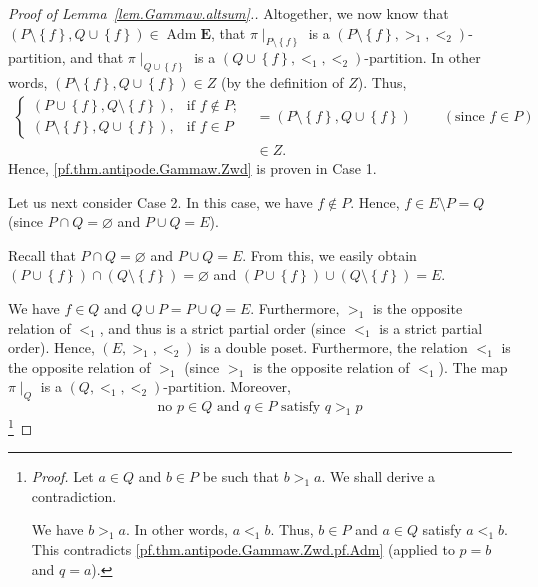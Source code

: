 \documentclass[12pt]{article}
\theoremstyle{plain}
\theoremstyle{definition}
\theoremstyle{remark}
\newcommand{\Adm}{\operatorname{Adm}}
\newcommand{\EE}{{\mathbf{E}}}
\begin{document}
\begin{proof}[Proof of Lemma~\ref{lem.Gammaw.altsum}.]
Altogether, we now know that $\left(  P\setminus\left\{  f\right\}
,Q\cup\left\{  f\right\}  \right)  \in \Adm \EE$, that
$\pi\mid_{P\setminus\left\{  f\right\}  }$ is a \newline
$\left(  P\setminus\left\{
f\right\}  ,>_{1},<_{2}\right)  $-partition, and that $\pi\mid_{Q\cup\left\{
f\right\}  }$ is a $\left(  Q\cup\left\{  f\right\}  ,<_{1},<_{2}\right)
$-partition. In other words, $\left(  P\setminus\left\{  f\right\}
,Q\cup\left\{  f\right\}  \right)  \in Z$ (by the definition of $Z$). Thus,
\begin{align*}
\begin{cases}
\left(  P\cup\left\{  f\right\}  ,Q\setminus\left\{  f\right\}  \right)  , &
\text{if }f\notin P;\\
\left(  P\setminus\left\{  f\right\}  ,Q\cup\left\{  f\right\}  \right)  , &
\text{if }f\in P
\end{cases}
& =\left(  P\setminus\left\{  f\right\}  ,Q\cup\left\{  f\right\}  \right)
\ \ \ \ \ \ \ \ \ \ \left(  \text{since }f\in P\right)  \\
& \in Z.
\end{align*}
Hence, \eqref{pf.thm.antipode.Gammaw.Zwd} is proven in Case 1.

Let us next consider Case 2. In this case, we have $f\notin P$. Hence,
$f \in E \setminus P = Q$ (since
$P \cap Q = \varnothing$ and $P \cup Q = E$).

Recall that $P\cap Q=\varnothing$ and $P\cup Q=E$. From this, we easily obtain
$\left(  P\cup\left\{  f\right\}  \right)  \cap\left(  Q\setminus\left\{
f\right\}  \right)  =\varnothing$ and $\left(  P\cup\left\{  f\right\}
\right)  \cup\left(  Q\setminus\left\{  f\right\}  \right)  =E$.

We have $f \in Q$ and
$Q \cup P = P \cup Q = E$. Furthermore, $>_1$ is the
opposite relation of $<_1$, and thus is a strict partial
order (since $<_1$ is a strict partial order). Hence,
$\left(E, >_1, <_2\right)$ is a double poset. Furthermore,
the relation $<_1$ is the opposite relation of $>_1$ (since $>_1$
is the opposite relation of $<_1$).
The map
$\pi\mid_Q$ is a $\left(Q, <_1, <_2\right)$-partition. Moreover,
\begin{equation}
\text{no } p \in Q \text{ and } q \in P \text{ satisfy }
q >_1 p
\label{pf.thm.antipode.Gammaw.Zwd.pf.AdmQP}
\end{equation}
\footnote{\textit{Proof.} Let $a \in Q$ and $b \in P$ be such that
$b >_1 a$. We shall derive a contradiction.

We have $b >_1 a$. In other words, $a <_1 b$. Thus, $b \in P$ and
$a \in Q$ satisfy $a <_1 b$. This contradicts
\eqref{pf.thm.antipode.Gammaw.Zwd.pf.Adm} (applied to $p = b$ and
$q = a$).

}
\end{proof}
\end{document}
